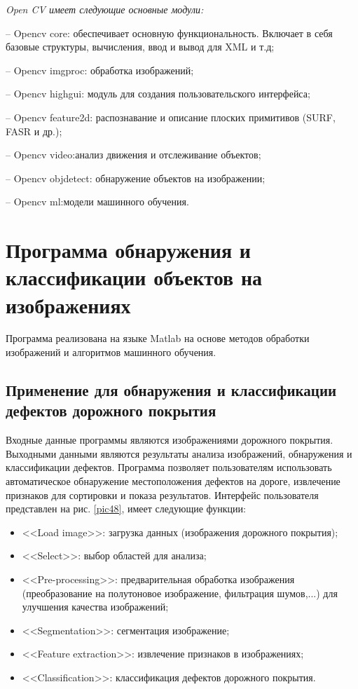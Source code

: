 \documentclass[a4paper,14pt]{extreport}
\begin{document}
\textit{Open CV имеет следующие основные модули:}

-- Opencv core: обеспечивает основную функциональность. Включает в себя базовые структуры, вычисления, ввод и вывод для XML и т.д;

-- Opencv imgproc: обработка изображений;

-- Opencv highgui: модуль для создания пользовательского интерфейса;

-- Opencv feature2d: распознавание и описание плоских примитивов (SURF, FASR и др.);

-- Opencv video:анализ движения и отслеживание объектов;

-- Opencv objdetect: обнаружение объектов на изображении;

-- Opencv ml:модели машинного обучения.
\section{Программа обнаружения и классификации объектов на изображениях}
Программа реализована на языке Matlab на основе методов обработки изображений и алгоритмов машинного обучения.  
\subsection{Применение для обнаружения и классификации дефектов дорожного покрытия}
Входные данные программы являются изображениями  дорожного покрытия. Выходными данными являются результаты анализа изображений, обнаружения и классификации дефектов. Программа позволяет пользователям использовать автоматическое обнаружение местоположения дефектов на дороге, извлечение признаков для сортировки и показа результатов. Интерфейс пользователя представлен на рис. \ref{pic48}, имеет следующие функции: 

\begin{itemize}
	\item <<Load image>>: загрузка данных (изображения дорожного покрытия); 
	\item <<Select>>: выбор областей для анализа; 
	\item <<Pre-processing>>: предварительная обработка изображения (преобразование на полутоновое изображение, фильтрация шумов,...) для улучшения качества изображений; 
		\item <<Segmentation>>: сегментация изображение; 
	\item <<Feature extraction>>: извлечение признаков в изображениях; 
	\item <<Classification>>: классификация дефектов дорожного покрытия.
\end{itemize}
\end{document}
